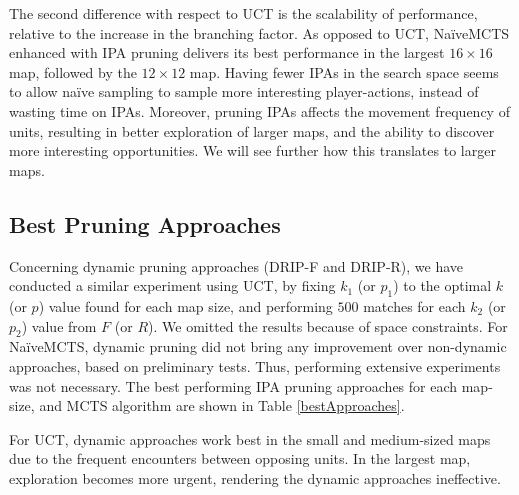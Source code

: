 \documentclass[conference]{IEEEtran}
\begin{document}
The second difference with respect to UCT is the scalability of performance, relative to the increase in the branching factor. As opposed to UCT, NaïveMCTS enhanced with IPA pruning delivers its best performance in the largest $16\times16$ map, followed by the $12\times12$ map. Having fewer IPAs in the search space seems to allow naïve sampling to sample more interesting player-actions, instead of wasting time on IPAs. Moreover, pruning IPAs affects the movement frequency of units, resulting in better exploration of larger maps, and the ability to discover more interesting opportunities. We will see further how this translates to larger maps.


\subsection{Best Pruning Approaches}

Concerning dynamic pruning approaches (DRIP-F and DRIP-R), we have conducted a similar experiment using UCT, by fixing $k_1$ (or $p_1$) to the optimal $k$ (or $p$) value found for each map size, and performing $500$ matches for each $k_2$ (or $p_2$) value from $F$ (or $R$). We omitted the results because of space constraints. For NaïveMCTS, dynamic pruning did not bring any improvement over non-dynamic approaches, based on preliminary tests. Thus, performing extensive experiments was not necessary. The best performing IPA pruning approaches for each map-size, and MCTS algorithm are shown in Table \ref{bestApproaches}.

\begin{table}[!h]
\renewcommand{\arraystretch}{1.3}
\caption{Best Performing Pruning Approaches}
\label{bestApproaches}
\centering
{}
\end{table}

For UCT, dynamic approaches work best in the small and medium-sized maps due to the frequent encounters between opposing units. In the largest map, exploration becomes more urgent, rendering the dynamic approaches ineffective.
\end{document}
